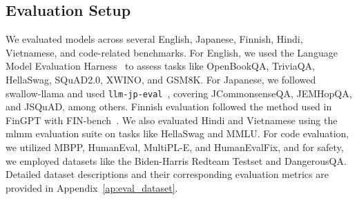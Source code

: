 \subsection{Evaluation Setup}

We evaluated models across several English, Japanese, Finnish, Hindi, Vietnamese, and code-related benchmarks. For English, we used the Language Model Evaluation Harness~\citep{leo_gao_2022_7413426_lm-evaluation-harness} to assess tasks like OpenBookQA, TriviaQA, HellaSwag, SQuAD2.0, XWINO, and GSM8K. For Japanese, we followed swallow-llama and used \texttt{llm-jp-eval}~\citep{han-etal-2024-llm-jp-eval}, covering JCommonsenseQA, JEMHopQA, and JSQuAD, among others. Finnish evaluation followed the method used in FinGPT with FIN-bench~\citep{luukkonen-etal-2023-fingpt}. We also evaluated Hindi and Vietnamese using the mlmm evaluation suite on tasks like HellaSwag and MMLU. For code evaluation, we utilized MBPP, HumanEval, MultiPL-E, and HumanEvalFix, and for safety, we employed datasets like the Biden-Harris Redteam Testset and DangerousQA. Detailed dataset descriptions and their corresponding evaluation metrics are provided in Appendix~\ref{ap:eval_dataset}.


